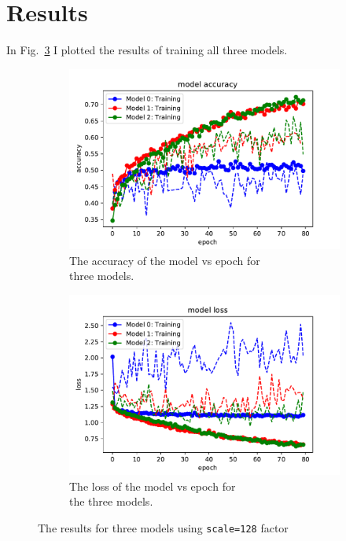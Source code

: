 \documentclass[10pt,a4paper]{article}
\begin{document}
\newpage
\section{Results}
 In Fig.~\ref{fig: Final results 128} I plotted the results of training all three models. 

\begin{figure}[h]
\centering
\begin{subfigure}{.7\textwidth}
  \centering
  \includegraphics[scale=0.5]{accuracy_vs_epoch_128.pdf}
  \caption{The accuracy of the model vs epoch for\\ three models.}
  \label{fig:sub1 128}
\end{subfigure}%
\begin{subfigure}{.6\textwidth}
  \centering
  \includegraphics[scale=0.5]{loss_vs_epoch_128.pdf}
  \caption{The loss of the model vs epoch for\\ the three models.}
  \label{fig:sub2 128}
\end{subfigure}
\caption{The results for three models using \lstinline{scale=128} factor}
\label{fig: Final results 128}
\end{figure}
\end{document}
